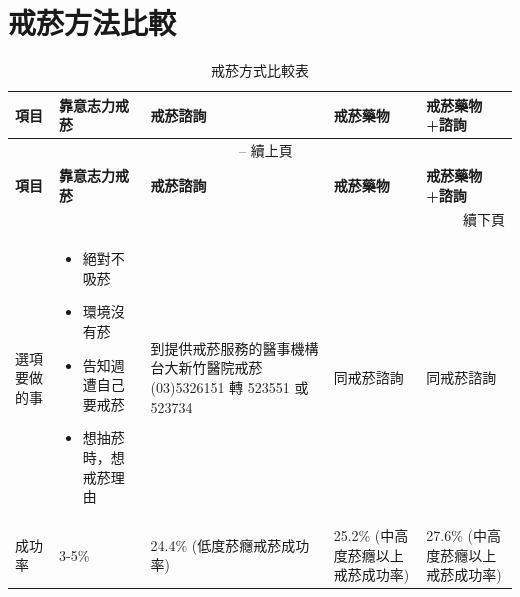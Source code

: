 \documentclass[nols]{tufte-book}
\begin{document}
\newpage
\section*{戒菸方法比較}


\begin{longtable}{|p{}|p{}|p{}|p{}|p{}|}
\caption{戒菸方式比較表} \label{tab:smoking-comparison} \\
\hline
\textbf{項目} & \textbf{靠意志力戒菸} & \textbf{戒菸諮詢} & \textbf{戒菸藥物} & \textbf{戒菸藥物+諮詢} \\
\hline
\endfirsthead

\multicolumn{5}{c}{\tablename\ \thetable{} -- 續上頁} \\
\hline
\textbf{項目} & \textbf{靠意志力戒菸} & \textbf{戒菸諮詢} & \textbf{戒菸藥物} & \textbf{戒菸藥物+諮詢} \\
\hline
\endhead

\hline
\multicolumn{5}{r}{續下頁} \\
\endfoot

\hline
\endlastfoot

選項要做的事 & 
\begin{itemize}
\item 絕對不吸菸
\item 環境沒有菸
\item 告知週遭自己要戒菸
\item 想抽菸時，想戒菸理由
\end{itemize} & 
到提供戒菸服務的醫事機構 \newline
台大新竹醫院戒菸(03)5326151 轉 523551 或 523734 & 
同戒菸諮詢 & 
同戒菸諮詢 \\
\hline

成功率 & 3-5\% & 
24.4\% \newline
(低度菸癮戒菸成功率) & 
25.2\% \newline
(中高度菸癮以上戒菸成功率) & 
27.6\% \newline
(中高度菸癮以上戒菸成功率) \\
\hline


\end{longtable}
\end{document}
